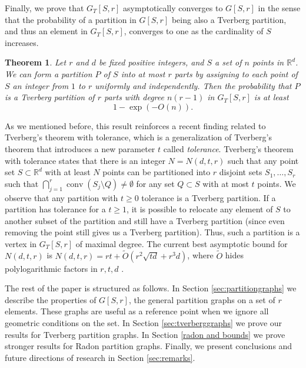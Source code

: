 \documentclass[11pt,a4paper]{article}
\theoremstyle{plain}
\newtheorem{theorem}{Theorem}[section]
\theoremstyle{definition}
\newcommand{\rr}{\mathds{R}}
\newcommand{\conv}{\operatorname{conv}}
\begin{document}

\medskip 

Finally, we prove that $G_T[S,r]$ asymptotically converges to $G[S,r]$ in the sense that the probability of a partition in $G[S,r]$ being also a Tverberg partition, and thus an element in $G_T[S,r]$, converges to one as the cardinality of $S$ increases. 

\begin{theorem} \label{thm:prob}
    Let $r$ and $d$ be fixed positive integers, and $S$ a set of $n$ points in $\rr^d$.  We can form a partition $P$ of $S$ into at most $r$ parts by assigning to each point of $S$ an integer from $1$ to $r$ uniformly and independently. Then the probability that $P$ is a Tverberg partition of $r$ parts with degree $n(r-1)$ in $G_T[S,r]$ is at least
    \[
1- \exp\left(-O(n)\right).
    \]
\end{theorem}

As we mentioned before, this result reinforces a recent finding related to Tverberg's theorem with tolerance, which is a generalization of Tverberg's theorem that introduces a new parameter $t$ called \emph{tolerance}.  Tverberg's theorem with tolerance states that there is an integer $N = N(d, t,r)$ such that any point set $S \subset \rr^d$ with at least $N$ points can be partitioned into $r$ disjoint sets $S_1,\dots, S_r$ such that $\bigcap_{j=1}^r \conv(S_j \setminus Q ) \neq \emptyset$ for any set $Q\subset S$ with at most $t$ points.  We observe that any partition with $t\geq 0$ tolerance is a Tverberg partition.  If a partition has tolerance for a $t\geq 1$, it is possible to relocate any element of $S$ to another subset of the partition and still have a Tverberg partition (since even removing the point still gives us a Tverberg partition). Thus, such a partition is a vertex in $G_T[S,r]$ of maximal degree. The current best asymptotic bound for $N(d,t,r)$ is $N(d,t,r) = rt + \tilde{O}(r^2\sqrt{td}+ r^3d)$, where $\tilde{O}$ hides polylogarithmic factors in $r,t,d$ \cite{Soberon:2018gn}.

\medskip
The rest of the paper is structured as follows. In Section \ref{sec:partitiongraphs} we describe the properties of $G[S,r]$, the general partition graphs on a set of $r$ elements.  These graphs are useful as a reference point when we ignore all geometric conditions on the set.  In Section \ref{sec:tverberggraphs} we prove our results for Tverberg partition graphs.  In Section \ref{radon and bounds} we prove stronger results for Radon partition graphs.  Finally, we present conclusions and future directions of research in Section \ref{sec:remarks}.
\end{document}
